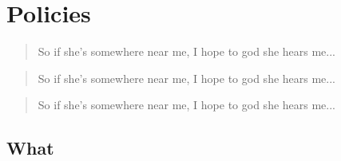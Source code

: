 \section{Policies}
\label{sec:Policies}
\lipsum[13]
\begin{beware}[Of This]
    \lipsum[25]
\end{beware}

\begin{verse}
    So if she’s somewhere
near me, I hope to god she
hears me...
\end{verse}
\begin{quotation}
    So if she’s somewhere
near me, I hope to god she
hears me...
\end{quotation}
\begin{quote}
    So if she’s somewhere
near me, I hope to god she
hears me...
\end{quote}
\subsection{What}
\lipsum[30-32]
